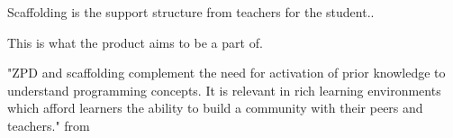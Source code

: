 Scaffolding is the support structure from teachers for the student.. 

This is what the product aims to be a part of.

"ZPD and scaffolding complement the need
for activation of prior knowledge to understand programming concepts. It is relevant in
rich learning environments which afford learners the ability to build a community with
their peers and teachers." from  \cite{wood_bruner_ross_1976}


